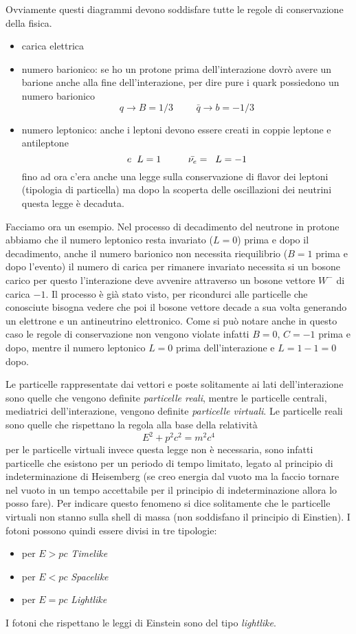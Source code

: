 Ovviamente questi diagrammi devono soddisfare tutte le regole di conservazione della fisica.
\begin{itemize}
\item carica elettrica
\item numero barionico: se ho un protone prima dell'interazione dovrò avere un barione anche alla fine dell'interazione, per dire pure i quark possiedono un numero barionico
\[
q\to B=1/3 \hspace{1cm} \bar{q}\to b=-1/3
\]
\item numero leptonico: anche i leptoni devono essere creati in coppie leptone e antileptone
\[
e\hspace{0.2cm}L=1\hspace{1cm}\bar{\nu_e}=\hspace{0.2cm}L=-1
\]
fino ad ora c'era anche una legge sulla conservazione di flavor dei leptoni (tipologia di particella) ma dopo la scoperta delle oscillazioni dei neutrini questa legge è decaduta.
\end{itemize}

Facciamo ora un esempio.
Nel processo di decadimento del neutrone in protone abbiamo che il numero leptonico resta invariato ($L=0$) prima e dopo il decadimento, anche il numero barionico non necessita riequilibrio ($B=1$ prima e dopo l'evento) il numero di carica per rimanere invariato necessita si un bosone carico per questo l'interazione deve avvenire attraverso un bosone vettore $W^-$ di carica $-1$.
Il processo è già stato visto, per ricondurci alle particelle che conosciute bisogna vedere che poi il bosone vettore decade a sua volta generando un elettrone e un antineutrino elettronico.
Come si può notare anche in questo caso le regole di conservazione non vengono violate infatti $B=0$, $C=-1$ prima e dopo, mentre il numero leptonico $L=0$ prima dell'interazione e $L=1-1=0$ dopo.

Le particelle rappresentate dai vettori e poste solitamente ai lati dell'interazione sono quelle che vengono definite \emph{particelle reali}, mentre le particelle centrali, mediatrici dell'interazione, vengono definite \emph{particelle virtuali}.
Le particelle reali sono quelle che rispettano la regola alla base della relatività
\begin{equation}
E^2+p^2c^2=m^2c^4
\end{equation}
per le particelle virtuali invece questa legge non è necessaria, sono infatti particelle che esistono per un periodo di tempo limitato, legato al principio di indeterminazione di Heisemberg (se creo energia dal vuoto ma la faccio tornare nel vuoto in un tempo accettabile per il principio di indeterminazione allora lo posso fare).
Per indicare questo fenomeno si dice solitamente che le particelle virtuali non stanno sulla shell di massa (non soddisfano il principio di Einstien).
I fotoni possono quindi essere divisi in tre tipologie:
\begin{itemize}
\item per $E>pc$ \emph{Timelike}
\item per $E<pc$ \emph{Spacelike}
\item per $E=pc$ \emph{Lightlike}
\end{itemize}
I fotoni che rispettano le leggi di Einstein sono del tipo \emph{lightlike}.

